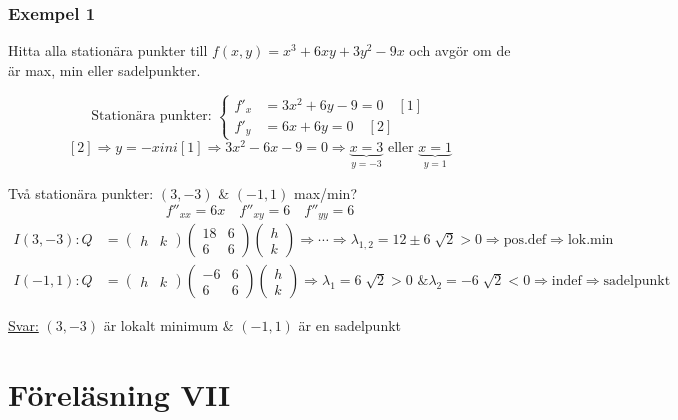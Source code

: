 \documentclass{article}
\let\oldsqrt\sqrt
\renewcommand*{\sqrt}[2][\ ]{\oldsqrt[#1]{#2} }
\begin{document}
\subsubsection{Exempel 1}
Hitta alla stationära punkter till $f(x,y) = x^3 + 6xy + 3y^2 - 9x$ och avgör om de är max, min eller sadelpunkter.

$$
	\text{Stationära punkter: }
	\left\{
	\begin{align}
	f'_x &= 3x^2 + 6y - 9 = 0 \quad [1] \\
	f'_y &= 6x + 6y = 0 \quad [2]
	\end{align}\right.
$$
$$
	[2] \Rightarrow y = -x in i [1] \Rightarrow 3x^2 - 6x - 9 = 0 \Rightarrow \underbrace{x=3}_{y=-3} \text{ eller } \underbrace{x=1}_{y=1}
$$

Två stationära punkter: $(3,-3)$ \& $(-1,1)$ max/min?
$$
	f''_{xx} = 6x \quad f''_{xy} = 6 \quad f''_{yy} = 6
$$
\begin{align*}
	I(3,-3): Q &= 
	\begin{pmatrix}
		h & k
	\end{pmatrix}
	\begin{pmatrix}
		18 & 6 \\
		6 & 6
	\end{pmatrix}
	\begin{pmatrix}
		h \\ 
		k
	\end{pmatrix}
	\Rightarrow \cdots \Rightarrow \lambda_{1,2} = 12 \pm 6\sqrt{2} > 0 \Rightarrow \text{pos.def} \Rightarrow \text{lok.min} \\
	I(-1,1): Q &= 
	\begin{pmatrix}
		h & k
	\end{pmatrix}
	\begin{pmatrix}
		-6 & 6 \\
		6 & 6
	\end{pmatrix}
	\begin{pmatrix}
		h \\ 
		k
	\end{pmatrix}
	\Rightarrow \lambda_1 = 6\sqrt{2} > 0 \text{ \& } \lambda_2 = -6\sqrt{2} < 0 \Rightarrow \text{indef} \Rightarrow \text{sadelpunkt}
\end{align*}

\underline{Svar:} $(3,-3)$ är lokalt minimum \& $(-1,1)$ är en sadelpunkt





\newpage
\section{Föreläsning VII}
\end{document}
